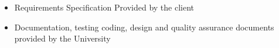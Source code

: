 \begin{itemize}
	\item Requirements Specification Provided by the client
	\item Documentation, testing coding, design and quality assurance documents provided by the University
\end{itemize}